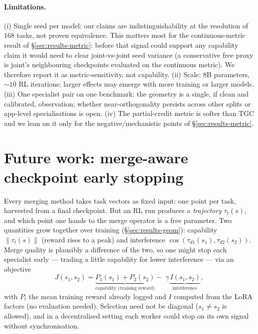 \documentclass[11pt]{article}
\newcommand{\tv}{\tau}                      %
\begin{document}
\paragraph{Limitations.} (i) Single seed per model: our claims are indistinguishability at
the resolution of $168$ tasks, not proven equivalence. This matters most for the
continuous-metric result of \S\ref{sec:results-metric}: before that signal could support
any capability claim it would need to clear joint-vs-joint seed variance (a conservative
free proxy is joint's neighbouring checkpoints evaluated on the continuous metric). We
therefore report it as metric-sensitivity, not capability. (ii) Scale: $8$B parameters,
$\sim\!10$ RL iterations; larger effects may emerge with more training or larger models.
(iii) One specialist pair on one benchmark: the geometry is a single, if clean and
calibrated, observation; whether near-orthogonality persists across other splits or
app-level specialisations is open. (iv) The partial-credit metric is softer than TGC and
we lean on it only for the negative/mechanistic points of \S\ref{sec:results-metric}.

\section{Future work: merge-aware checkpoint early stopping}
\label{sec:future}
Every merging method takes task vectors as fixed input: one point per task, harvested
from a final checkpoint. But an RL run produces a \emph{trajectory} $\tv_t(s)$, and which
point one hands to the merge operator is a free parameter. Two quantities grow together
over training (\S\ref{sec:results-geom}): capability $\|\tv_t(s)\|$ (reward rises to a
peak) and interference $\cos(\tv_{d1}(s_1),\tv_{d2}(s_2))$. Merge quality is plausibly a
difference of the two, so one might stop each specialist early --- trading a little
capability for lower interference --- via an objective
\begin{equation}
J(s_1,s_2)=\underbrace{P_1(s_1)+P_2(s_2)}_{\text{capability (training reward)}}
-\;\gamma\underbrace{\,I(s_1,s_2)}_{\text{interference}},
\label{eq:jobj}
\end{equation}
with $P_t$ the mean training reward already logged and $I$ computed from the LoRA factors
(no evaluation needed). Selection need not be diagonal ($s_1\neq s_2$ is allowed), and in
a decentralised setting each worker could stop on its own signal without synchronisation.
\end{document}
